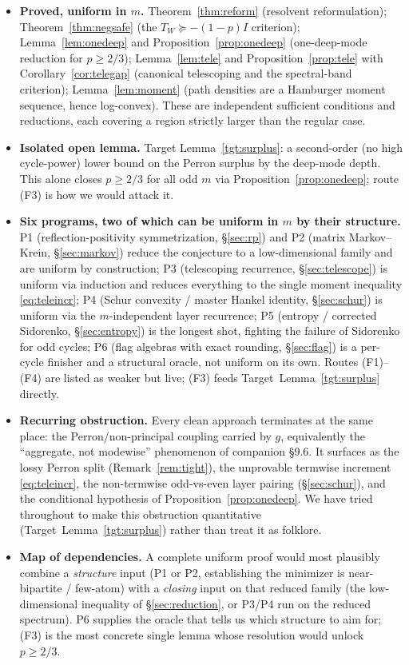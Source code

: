 \documentclass[11pt]{article}
\theoremstyle{definition}
\newcommand{\1}{\mathbf{1}}
\begin{document}
\begin{itemize}[leftmargin=2em]
\item \textbf{Proved, uniform in $m$.}
Theorem~\ref{thm:reform} (resolvent reformulation);
Theorem~\ref{thm:negsafe} (the $T_W\succeq-(1-p)I$ criterion);
Lemma~\ref{lem:onedeep} and Proposition~\ref{prop:onedeep} (one-deep-mode
reduction for $p\ge2/3$);
Lemma~\ref{lem:tele} and Proposition~\ref{prop:tele} with
Corollary~\ref{cor:telegap} (canonical telescoping and the spectral-band
criterion);
Lemma~\ref{lem:moment} (path densities are a Hamburger moment sequence, hence
log-convex). These are independent sufficient conditions and reductions, each
covering a region strictly larger than the regular case.
\item \textbf{Isolated open lemma.} Target Lemma~\ref{tgt:surplus}: a
second-order (no high cycle-power) lower bound on the Perron surplus by the
deep-mode depth. This alone closes $p\ge2/3$ for all odd $m$ via
Proposition~\ref{prop:onedeep}; route (F3) is how we would attack it.
\item \textbf{Six programs, two of which can be uniform in $m$ by their
structure.}
P1 (reflection-positivity symmetrization, \S\ref{sec:rp}) and
P2 (matrix Markov--Krein, \S\ref{sec:markov}) reduce the conjecture to a
low-dimensional family and are uniform by construction;
P3 (telescoping recurrence, \S\ref{sec:telescope}) is uniform via induction and
reduces everything to the single moment inequality \eqref{eq:teleincr};
P4 (Schur convexity / master Hankel identity, \S\ref{sec:schur}) is uniform via
the $m$-independent layer recurrence;
P5 (entropy / corrected Sidorenko, \S\ref{sec:entropy}) is the longest shot,
fighting the failure of Sidorenko for odd cycles;
P6 (flag algebras with exact rounding, \S\ref{sec:flag}) is a per-cycle finisher
and a structural oracle, not uniform on its own.
Routes (F1)--(F4) are listed as weaker but live; (F3) feeds
Target~Lemma~\ref{tgt:surplus} directly.
\item \textbf{Recurring obstruction.} Every clean approach terminates at the same
place: the Perron/non-principal coupling carried by $g$, equivalently the
``aggregate, not modewise'' phenomenon of companion \S9.6. It surfaces as the
lossy Perron split (Remark~\ref{rem:tight}), the unprovable termwise increment
\eqref{eq:teleincr}, the non-termwise odd-vs-even layer pairing
(\S\ref{sec:schur}), and the conditional hypothesis of
Proposition~\ref{prop:onedeep}. We have tried throughout to make this obstruction
quantitative (Target~Lemma~\ref{tgt:surplus}) rather than treat it as folklore.
\item \textbf{Map of dependencies.} A complete uniform proof would most plausibly
combine a \emph{structure} input (P1 or P2, establishing the minimizer is
near-bipartite / few-atom) with a \emph{closing} input on that reduced family
(the low-dimensional inequality of \S\ref{sec:reduction}, or P3/P4 run on the
reduced spectrum). P6 supplies the oracle that tells us which structure to aim
for; (F3) is the most concrete single lemma whose resolution would unlock
$p\ge2/3$.
\end{itemize}
\end{document}
